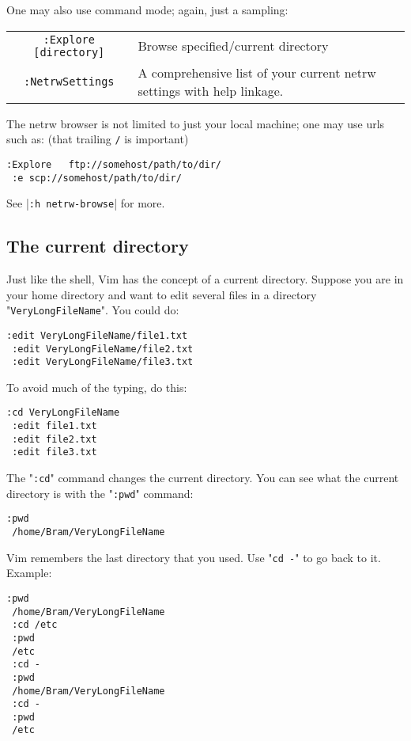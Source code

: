 One may also use command mode; again, just a sampling:

\begin{center} \begin{longtable}{c l}
				\verb!:Explore [directory]! & Browse specified/current directory \\
				\verb!:NetrwSettings! & A comprehensive list of your current netrw settings with help linkage.
\end{longtable} \end{center}

The netrw browser is not limited to just your local machine; one may use urls such as:
(that trailing \verb!/! is important)

\begin{Verbatim}[samepage=true]
 :Explore   ftp://somehost/path/to/dir/
 :e scp://somehost/path/to/dir/
\end{Verbatim}

See |\verb!:h netrw-browse!| for more.
\subsection{The current directory}

Just like the shell, Vim has the concept of a current directory.
Suppose you are in your home directory and want to edit several files in a directory "\verb!VeryLongFileName!".
You could do:

\begin{Verbatim}[samepage=true]
 :edit VeryLongFileName/file1.txt
 :edit VeryLongFileName/file2.txt
 :edit VeryLongFileName/file3.txt
\end{Verbatim}

To avoid much of the typing, do this:

\begin{Verbatim}[samepage=true]
 :cd VeryLongFileName
 :edit file1.txt
 :edit file2.txt
 :edit file3.txt
\end{Verbatim}

The "\verb!:cd!" command changes the current directory.
You can see what the current directory is with the "\verb!:pwd!" command:

\begin{Verbatim}[samepage=true]
 :pwd
 /home/Bram/VeryLongFileName
\end{Verbatim}

Vim remembers the last directory that you used.
Use "\verb!cd -!" to go back to it.
Example:

\begin{Verbatim}[samepage=true]
 :pwd
 /home/Bram/VeryLongFileName
 :cd /etc
 :pwd
 /etc
 :cd -
 :pwd
 /home/Bram/VeryLongFileName
 :cd -
 :pwd
 /etc
\end{Verbatim}

